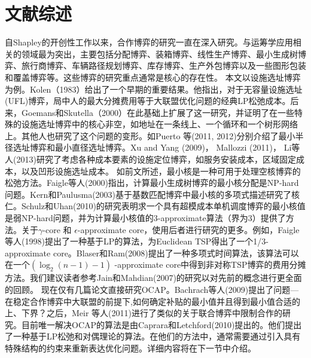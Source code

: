 \documentclass[UTF8]{article}
\begin{document}
\section{文献综述}
自Shapley的开创性工作以来，合作博弈的研究一直在深入研究。与运筹学应用相关的领域最为突出，主要包括分配博弈、装箱博弈、线性生产博弈、最小生成树博弈、旅行商博弈、车辆路径规划博弈、库存博弈、生产外包博弈以及一些图形包装和覆盖博弈等。这些博弈的研究重点通常是核心的存在性。
本文以设施选址博弈为例。Kolen（1983）给出了一个早期的重要结果。他指出，对于无容量设施选址(UFL)博弈，局中人的最大分摊费用等于大联盟优化问题的经典LP松弛成本。后来，Goemans和Skutella（2000）在此基础上扩展了这一研究，并证明了在一些特殊的设施选址博弈中的核心非空，如地址在一条线上、一个循环和一个树形网络上。其他人也研究了这个问题的变形。如Puerto 等(2011, 2012)分别介绍了最小半径选址博弈和最小直径选址博弈。Xu and Yang (2009)， Mallozzi (2011)， Li等人(2013)研究了考虑各种成本要素的设施定位博弈，如服务安装成本，区域固定成本，以及凹形设施选址成本。
如前文所述，最小核是一种可用于处理空核博弈的松弛方法。Faigle等人(2000)指出，计算最小生成树博弈的最小核分配是NP-hard问题。Kern和Paulusma(2003)基于基数匹配博弈中最小核的多项式描述研究了核仁。Schulz和Uhan(2010)的研究表明求一个具有超模成本单机调度博弈的最小核值是弱NP-hard问题，并为计算最小核值的3-approximate算法（界为3）提供了方法。关于$\gamma$-core 和 $\epsilon$-approximate core，使用后者进行研究的更多。例如，Faigle等人(1998)提出了一种基于LP的算法，为Euclidean TSP得出了一个1/3- approximate core。Blaser和Ram(2008)提出了一种多项式时间算法，该算法可以在一个$(\log_2(n-1)-1)$ -approximate core中得到非对称TSP博弈的费用分摊方法。我们建议读者参考Jain和Mahdian(2007)的研究以对先前的概念进行更全面的回顾。
现在仅有几篇论文直接研究OCAP。Bachrach等人(2009)提出了问题—在稳定合作博弈中大联盟的前提下,如何确定补贴的最小值并且得到最小值合适的上、下界？之后，Meir 等人(2011)进行了类似的关于联合博弈中限制合作的研究。目前唯一解决OCAP的算法是由Caprara和Letchford(2010)提出的。他们提出了一种基于LP松弛和对偶理论的算法。在他们的方法中，通常需要通过引入具有特殊结构的约束来重新表达优化问题。详细内容将在下一节中介绍。
\end{document}

